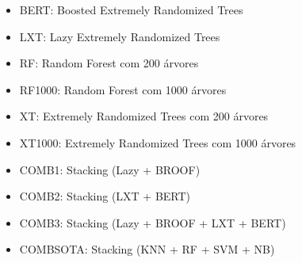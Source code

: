 \documentclass[]{article}
\begin{document}
\begin{itemize}
\itemsep1pt\parskip0pt
\item
  BERT: Boosted Extremely Randomized Trees
\item
  LXT: Lazy Extremely Randomized Trees
\item
  RF: Random Forest com 200 árvores
\item
  RF1000: Random Forest com 1000 árvores
\item
  XT: Extremely Randomized Trees com 200 árvores
\item
  XT1000: Extremely Randomized Trees com 1000 árvores
\item
  COMB1: Stacking (Lazy + BROOF)
\item
  COMB2: Stacking (LXT + BERT)
\item
  COMB3: Stacking (Lazy + BROOF + LXT + BERT)
\item
  COMBSOTA: Stacking (KNN + RF + SVM + NB)
\end{itemize}
\end{document}
